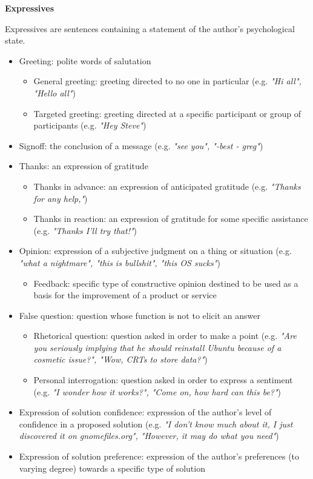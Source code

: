\documentclass[11pt]{article}
\begin{document}
\begin{itemize}
\textbf{Expressives}
\vspace{0.1cm}

Expressives are sentences containing a statement of the author's psychological state.

\begin{itemize}
	\item Greeting: polite words of salutation
		\begin{itemize}
			\item General greeting: greeting directed to no one in particular (e.g. \textit{"Hi all", "Hello all"})
			\item Targeted greeting: greeting directed at a specific participant or group of participants (e.g. \textit{"Hey Steve"})
		\end{itemize}
	\item Signoff: the conclusion of a message (e.g. \textit{"see you", "-best - greg"})
	\item Thanks: an expression of gratitude
		\begin{itemize}
			\item Thanks in advance: an expression of anticipated gratitude (e.g. \textit{"Thanks for any help,"})
			\item Thanks in reaction: an expression of gratitude for some specific assistance (e.g. \textit{"Thanks I'll try that!"})
		\end{itemize}
	\item Opinion: expression of a subjective judgment on a thing or situation (e.g. \textit{"what a nightmare", "this is bullshit", "this OS sucks"})
		\begin{itemize}
			\item Feedback: specific type of constructive opinion destined to be used as a basis for the improvement of a product or service
		\end{itemize}
	\item False question: question whose function is not to elicit an answer
		\begin{itemize}
			\item Rhetorical question: question asked in order to make a point (e.g. \textit{"Are you seriously implying that he should reinstall Ubuntu because of a cosmetic issue?", "Wow, CRTs to store data?"})
			\item Personal interrogation: question asked in order to express a sentiment (e.g. \textit{"I wonder how it works?", "Come on, how hard can this be?"})
		\end{itemize}
	\item Expression of solution confidence: expression of the author's level of confidence in a proposed solution (e.g. \textit{"I don't know much about it, I just discovered it on gnomefiles.org", "However, it may do what you need"})
	\item Expression of solution preference: expression of the author's preferences (to varying degree) towards a specific type of solution
\end{itemize}


\end{itemize}
\end{document}
